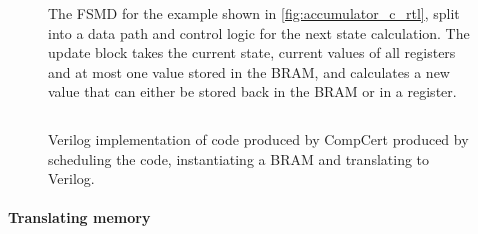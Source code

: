 \begin{figure}
\caption{The FSMD for the example shown in \cref{fig:accumulator_c_rtl}, split
  into a data path and control logic for the next state calculation.  The update
  block takes the current state, current values of all registers and at most one
  value stored in the \gls{BRAM}, and calculates a new value that can either be
  stored back in the \gls{BRAM} or in a
  register.}\label{fig:accumulator_diagram}
\end{figure}

\begin{figure}
  \centering
  \inputminted[fontsize=\footnotesize,linenos,xleftmargin=20pt]{systemverilog}{figures/3-introduction-to-vericert/translated-verilog.sv}
  \caption{Verilog implementation of \rtl{} code produced by CompCert produced
    by scheduling the code, instantiating a BRAM and translating to Verilog.}
  \label{fig:accumulator_v}
\end{figure}

\paragraph{Translating memory}

